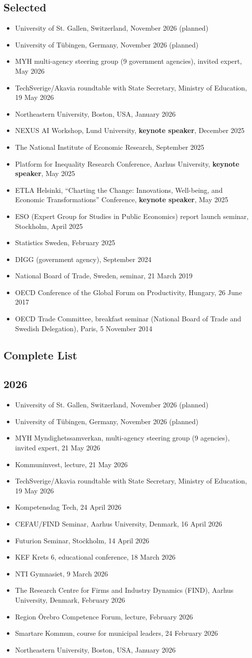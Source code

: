 \documentclass[11pt,a4paper]{article}
\newcommand{\cventry}[1]{\item #1}
\begin{document}
\subsection{Selected}
\begin{itemize}

  \cventry{University of St. Gallen, Switzerland, November 2026 (planned)}
  \cventry{University of Tübingen, Germany, November 2026 (planned)}
  \cventry{MYH multi-agency steering group (9 government agencies), invited expert, May 2026}
  \cventry{TechSverige/Akavia roundtable with State Secretary, Ministry of Education, 19 May 2026}
  \cventry{Northeastern University, Boston, USA, January 2026}
  \cventry{NEXUS AI Workshop, Lund University, \textbf{keynote speaker}, December 2025}
  \cventry{The National Institute of Economic Research, September 2025}
  \cventry{Platform for Inequality Research Conference, Aarhus University, \textbf{keynote speaker}, May 2025}
  \cventry{ETLA Helsinki, ``Charting the Change: Innovations, Well-being, and Economic Transformations'' Conference, \textbf{keynote speaker}, May 2025}
  \cventry{ESO (Expert Group for Studies in Public Economics) report launch seminar, Stockholm, April 2025}
  \cventry{Statistics Sweden, February 2025}
  \cventry{DIGG (government agency), September 2024}
  \cventry{National Board of Trade, Sweden, seminar, 21 March 2019}
  \cventry{OECD Conference of the Global Forum on Productivity, Hungary, 26 June 2017}
  \cventry{OECD Trade Committee, breakfast seminar (National Board of Trade and Swedish Delegation), Paris, 5 November 2014}

\end{itemize}

\subsection{Complete List}
\subsection{2026}
\begin{itemize}
  \cventry{University of St. Gallen, Switzerland, November 2026 (planned)}
  \cventry{University of Tübingen, Germany, November 2026 (planned)}
  \cventry{MYH Myndighetssamverkan, multi-agency steering group (9 agencies), invited expert, 21 May 2026}
  \cventry{Kommuninvest, lecture, 21 May 2026}
  \cventry{TechSverige/Akavia roundtable with State Secretary, Ministry of Education, 19 May 2026}
  \cventry{Kompetensdag Tech, 24 April 2026}
  \cventry{CEFAU/FIND Seminar, Aarhus University, Denmark, 16 April 2026}
  \cventry{Futurion Seminar, Stockholm, 14 April 2026}
  \cventry{KEF Krets 6, educational conference, 18 March 2026}
  \cventry{NTI Gymnasiet, 9 March 2026}
  \cventry{The Research Centre for Firms and Industry Dynamics (FIND), Aarhus University, Denmark, February 2026}
  \cventry{Region Örebro Competence Forum, lecture, February 2026}
  \cventry{Smartare Kommun, course for municipal leaders, 24 February 2026}
  \cventry{Northeastern University, Boston, USA, January 2026}
\end{itemize}
\end{document}

